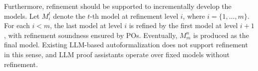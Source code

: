 Furthermore, refinement should be supported to incrementally develop the models.
Let $M_i^t$ denote the $t$-th model at refinement level $i$, where $i=\{1,\dots,m\}$.
For each $i < m$, the last model at level $i$ is refined by the first model at level $i+1$, with refinement soundness ensured by POs.
Eventually, $M_m^n$ is produced as the final model.
Existing LLM-based autoformalization does not support refinement in this sense, and LLM proof assistants operate over fixed models without refinement.
